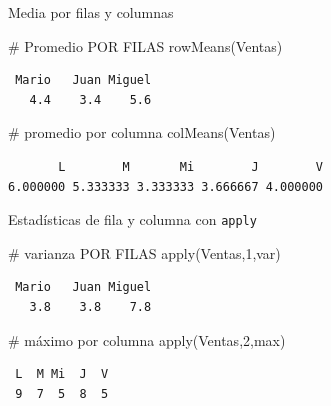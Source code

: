 \documentclass[
  ignorenonframetext,
  aspectratio=169,
  spanish,
]{beamer}
\newenvironment{Shaded}{\begin{snugshade}}{\end{snugshade}}
\newcommand{\CommentTok}[1]{\textcolor[rgb]{0.37,0.37,0.37}{#1}}
\newcommand{\DecValTok}[1]{\textcolor[rgb]{0.68,0.00,0.00}{#1}}
\newcommand{\FunctionTok}[1]{\textcolor[rgb]{0.28,0.35,0.67}{#1}}
\newcommand{\NormalTok}[1]{\textcolor[rgb]{0.00,0.23,0.31}{#1}}
\begin{document}
\begin{frame}[fragile]{Media por filas y columnas}
\label{media-por-filas-y-columnas}
\begin{Shaded}
\begin{Highlighting}[]
\CommentTok{\# Promedio POR FILAS }
\FunctionTok{rowMeans}\NormalTok{(Ventas)}
\end{Highlighting}
\end{Shaded}

\begin{verbatim}
 Mario   Juan Miguel 
   4.4    3.4    5.6 
\end{verbatim}

\begin{Shaded}
\begin{Highlighting}[]
\CommentTok{\# promedio por columna }
\FunctionTok{colMeans}\NormalTok{(Ventas)}
\end{Highlighting}
\end{Shaded}

\begin{verbatim}
       L        M       Mi        J        V 
6.000000 5.333333 3.333333 3.666667 4.000000 
\end{verbatim}
\end{frame}

\begin{frame}[fragile]{Estadísticas de fila y columna con
\texttt{apply}}
\label{estaduxedsticas-de-fila-y-columna-con-apply}
\begin{Shaded}
\begin{Highlighting}[]
\CommentTok{\# varianza  POR FILAS }
\FunctionTok{apply}\NormalTok{(Ventas,}\DecValTok{1}\NormalTok{,var)}
\end{Highlighting}
\end{Shaded}

\begin{verbatim}
 Mario   Juan Miguel 
   3.8    3.8    7.8 
\end{verbatim}

\begin{Shaded}
\begin{Highlighting}[]
\CommentTok{\# máximo por columna }
\FunctionTok{apply}\NormalTok{(Ventas,}\DecValTok{2}\NormalTok{,max) }
\end{Highlighting}
\end{Shaded}

\begin{verbatim}
 L  M Mi  J  V 
 9  7  5  8  5 
\end{verbatim}
\end{frame}
\end{document}
